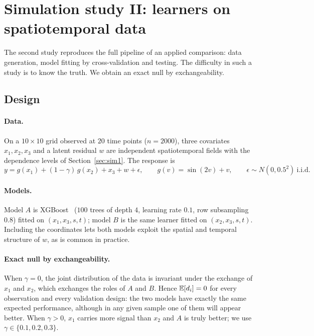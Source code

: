 \section{Simulation study II: learners on spatiotemporal data}\label{sec:sim2}

The second study reproduces the full pipeline of an applied comparison: data generation, model fitting by cross-validation and testing. The difficulty in such a study is to know the truth. We obtain an exact null by exchangeability.

\subsection{Design}

\paragraph{Data.} On a $10\times10$ grid observed at $20$ time points ($n=2000$), three covariates $x_1,x_2,x_3$ and a latent residual $w$ are independent spatiotemporal fields with the dependence levels of Section~\ref{sec:sim1}. The response is
\[
y=g(x_1)+(1-\gamma)\,g(x_2)+x_3+w+\epsilon,\qquad g(v)=\sin(2v)+v,\qquad \epsilon\sim N(0,0.5^2)\ \text{i.i.d.}
\]
\paragraph{Models.} Model $A$ is XGBoost~\cite{chen2016} ($100$ trees of depth $4$, learning rate $0.1$, row subsampling $0.8$) fitted on $(x_1,x_3,s,t)$; model $B$ is the same learner fitted on $(x_2,x_3,s,t)$. Including the coordinates lets both models exploit the spatial and temporal structure of $w$, as is common in practice.

\paragraph{Exact null by exchangeability.} When $\gamma=0$, the joint distribution of the data is invariant under the exchange of $x_1$ and $x_2$, which exchanges the roles of $A$ and $B$. Hence $\mathbb{E}[d_i]=0$ for every observation and every validation design: the two models have exactly the same expected performance, although in any given sample one of them will appear better. When $\gamma>0$, $x_1$ carries more signal than $x_2$ and $A$ is truly better; we use $\gamma\in\{0.1,0.2,0.3\}$.

